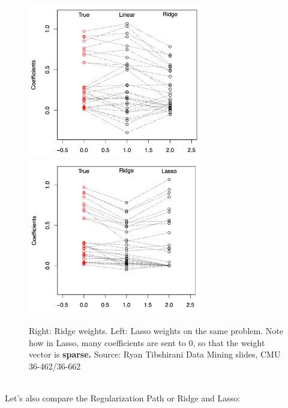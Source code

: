         \begin{figure}[H]
      \centering
      \includegraphics[width=3in]{ridge_coefs.jpeg}
      \,\,
      \includegraphics[width=3in]{lasso_coefs.jpeg}
      \caption{Right: Ridge weights. 
        Left: Lasso weights on the same problem. Note how in Lasso, many
        coefficients are sent to $0$, so that the weight vector is {\bf sparse.}
        Source: Ryan Tibshirani Data Mining slides, CMU 36-462/36-662 }
    \end{figure}
~\\
Let's also compare the Regularization Path or Ridge and Lasso:
